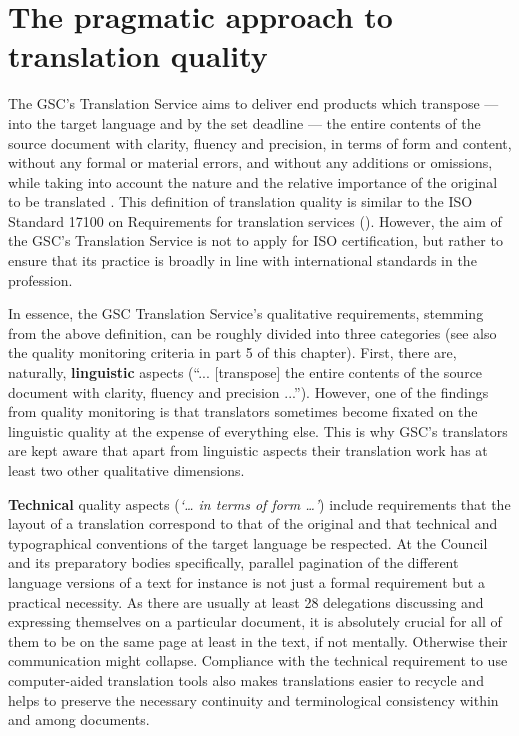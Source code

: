 \documentclass[output=paper]{langsci/langscibook}
\begin{document}
\section{The pragmatic approach to translation quality}\label{sec:hanzl:hanzl:2}

The GSC's Translation Service aims to deliver end products which transpose — into the target language and by the set deadline — the entire contents of the source document with clarity, fluency and precision, in terms of form and content, without any formal or material errors, and without any additions or omissions, while taking into account the nature and the relative importance of the original to be translated \citep[4]{Council2006}. This definition of translation quality is similar to the ISO Standard 17100 on Requirements for translation services (\citeyear{ISO2015}). However, the aim of the GSC's Translation Service is not to apply for ISO certification, but rather to ensure that its practice is broadly in line with international standards in the profession.

In essence, the GSC Translation Service's qualitative requirements, stemming from the above definition, can be roughly divided into three categories (see also the quality monitoring criteria in part 5 of this chapter). First, there are, naturally, \textbf{linguistic} aspects (“... [transpose] the entire contents of the source document with clarity, fluency and precision ...”). However, one of the findings from quality monitoring is that translators sometimes become fixated on the linguistic quality at the expense of everything else. This is why GSC's translators are kept aware that apart from linguistic aspects their translation work has at least two other qualitative dimensions. 

\textbf{Technical} quality aspects (\textit{‘… in terms of form …’}) include requirements that the layout of a translation correspond to that of the original and that technical and typographical conventions of the target language be respected. At the Council and its preparatory bodies specifically, parallel pagination of the different language versions of a text for instance is not just a formal requirement but a practical necessity. As there are usually at least 28 delegations discussing and expressing themselves on a particular document, it is absolutely crucial for all of them to be on the same page at least in the text, if not mentally. Otherwise their communication might collapse. Compliance with the technical requirement to use computer-aided translation tools also makes translations easier to recycle and helps to preserve the necessary continuity and terminological consistency within and among documents.
\end{document}
